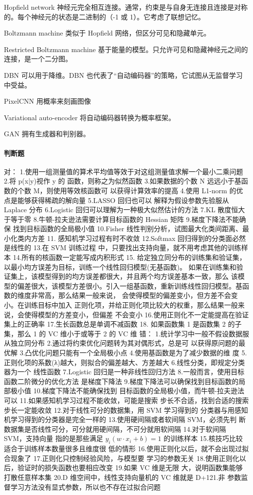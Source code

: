 {Hopfield network}
神经元完全相互连接。通常，约束是与自身无连接且连接是对称的。每个神经元的状态是二进制的（-1 或 1）。它考虑了联想记忆。

{Boltzmann machine}
类似于 Hopfield 网络，但区分可见和隐藏单元。

{Restricted Boltzmann machine}
基于能量的模型。只允许可见和隐藏神经元之间的连接，是一个二分图。

{DBN}
可以用于降维。DBN 也代表了“自动编码器”的策略，它试图从无监督学习中受益。

{PixelCNN}
用概率来刻画图像

{Variational auto-encoder}
将自动编码器转换为概率框架。

{GAN}
拥有生成器和判别器。

\paragraph{判断题}
对：
1.使用一组测量值的算术平均值等效于对这组测量值求解一个最小二乘问题 2.将 p(x|y)视作 y 的
函数，则称之为似然函数 3.如果数据的个数 N 远远小于基函数的个数 M，则使用等效核函数可
以获得计算效率的提高 4.使用 L1-norm 的优点是能够获得稀疏的解向量 5.LASSO 回归也可以
解释为假设参数先验服从 Laplace 分布 6.Logistic 回归可以理解为一种极大似然估计的方法 7.KL 散度恒大于等于零 8.牛顿-拉夫逊法需要计算目标函数的 Hessian 矩阵 9.梯度下降法不能确保
找到目标函数的全局极小值 10.Fisher 线性判别分析，试图最大化类间距离、最小化类内方差 11.
感知机学习过程有时不收敛 12.Softmax 回归得到的分类面必然是线性的 13.在 SVM 训练过程
中，只要找出支持向量，就不用考虑其他的训练样本 14.所有的核函数一定能写成内积形式 15.
给定独立同分布的训练集和验证集，以最小均方误差为目标，训练一个线性回归模型(无基函数)。
如果在训练集和验证集上，该模型得到的均方误差都很大，并且两个均方误差基本一致，那么
该模型的偏差很大，该模型方差很小。引入一组基函数，重新训练线性回归模型。基函数的维度非常高，那么结果一般来说， 会使得模型的偏差变小，但方差不会变小。在训练目标中加入
正则化项，并给正则化项比较大的权重，那么结果一般来说，会使得模型的方差变小，但偏差
不会变小 16.使用正则化不一定能提高在验证集上的正确率 17.生长函数总是单调不减函数 18.
如果函数集 1 是函数集 2 的子集，那么 1 的 VC 维小于或等于 2 的 VC 维
错：
1.统计学习中一般不假设数据服从独立同分布 2.通过将约束优化问题转为其对偶形式，总是可
以获得原问题的最优解 3.凸优化问题只能有一个全局极小点 4.使用基函数是为了减少数据的维
度 5.正则化项的系数(λ)越大，则拟合的偏差越大、方差越大 6.线性分类，即规定分类器为一个
线性函数 7.Logistic 回归是一种非线性回归方法 8.一般而言，使用目标函数二阶微分的优化方法
是梯度下降法 9.梯度下降法可以确保找到目标函数的局部极小值 10.梯度下降法不能确保找到
目标函数的全局极小值，而牛顿-拉夫逊法可以 11.如果感知机学习过程不能收敛，可能是搜索
步长不合适，找到合适的搜索步长一定能收敛 12.对于线性可分的数据集，用 SVM 学习得到的
分类器与用感知机学习得到的分类器是完全一样的 13.使用硬间隔或者软间隔 SVM，必须先判
断数据集是否线性可分，可分就用硬间隔，不可分就用软间隔 14.对于软间隔 SVM，支持向量
指的是那些满足 $y_i(w·x_i+b)=1$ 的训练样本 15.核技巧比较适合于训练样本数量很多且维度很
低的情形 16.使用正则化以后，就不会出现过拟合现象了 17.正则化只控制经验风险，与模型要
学习的参数无关 18.使用正则化以后，验证时的损失函数也要相应改变 19.如果 VC 维是无限
大，说明函数集能够打散任意样本集 20.D 维空间中，线性支持向量机的 VC 维就是 D+121.非
参数监督学习方法没有显式参数，所以也不存在过拟合问题